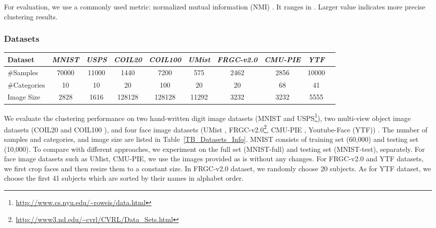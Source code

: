 \documentclass[10pt,twocolumn,letterpaper]{article}
\begin{document}
For evaluation, we use a commonly used metric: normalized mutual information (NMI) \cite{xu2003document}. It ranges in . Larger value indicates more precise clustering results. 

\subsubsection{Datasets}
\begin{table*}[!ht]
\caption{{Datasets used in our experiments.}}
\vspace{-15pt}
\center
\small
\begin{tabular}{lccccccccc}
\toprule
  Dataset & \textit{MNIST} & \textit{USPS} & \textit{COIL20} & \textit{COIL100} & \textit{UMist}  & \textit{FRGC-v2.0} & \textit{CMU-PIE}  & \textit{YTF} \\  
  \midrule
  \#Samples    & 70000 &11000 & 1440   & 7200    & 575  & 2462 & 2856    & 10000           \\
  \#Categories  & 10    & 10   & 20     & 100    & 20    & 20  & 68      & 41                   \\  
  Image Size  & 2828 & 1616   &128128     & 128128     & 11292    & 3232  & 3232      & 5555                  \\  
\bottomrule
\end{tabular}
\label{TB_Datasets_Info}
\end{table*}
We evaluate the clustering performance on two hand-written digit image datasets (MNIST \cite{lecun1998gradient} and USPS\footnote{\url{http://www.cs.nyu.edu/~roweis/data.html}}), two multi-view object image datasets (COIL20 and COIL100 \cite{nene1996columbia}), and four face image datasets (UMist \cite{graham1998characterising}, FRGC-v2.0\footnote{\url{http://www3.nd.edu/~cvrl/CVRL/Data_Sets.html}}, CMU-PIE \cite{sim2002cmu}, Youtube-Face (YTF)) \cite{wolf2011face}. The number of samples and categories, and image size are listed in Table~\ref{TB_Datasets_Info}. MNIST consists of training set (60,000) and testing set (10,000). To compare with different approaches, we experiment on the full set (MNIST-full) and testing set (MNIST-test), separately. For face image datasets such as UMist, CMU-PIE, we use the images provided {as is} without any changes. For FRGC-v2.0 and YTF datasets, we first crop faces and then resize them to a constant size. In FRGC-v2.0 dataset, we randomly choose 20 subjects. As for YTF dataset, we choose the first 41 subjects which are sorted by their names in alphabet order.
\end{document}
